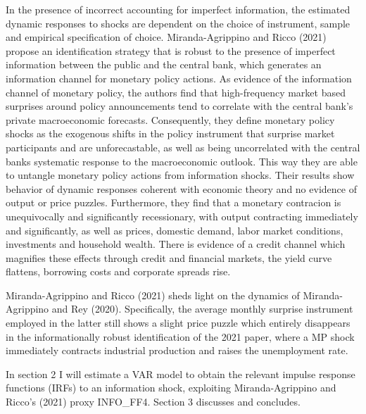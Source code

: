 \documentclass[11pt,a4paper,draft]{article}
\begin{document}
In the presence of incorrect accounting for imperfect information, the estimated dynamic responses to shocks are dependent on the choice of instrument, sample and empirical specification of choice. Miranda-Agrippino and Ricco (2021) propose an identification strategy that is robust to the presence of imperfect information between the public and the central bank, which generates an information channel for monetary policy actions. 
As evidence of the information channel of monetary policy, the authors find that high-frequency market based surprises around policy announcements tend to correlate with the central bank's private macroeconomic forecasts. Consequently, they define monetary policy shocks as the exogenous shifts in the policy instrument that surprise market participants and are unforecastable, as well as being uncorrelated with the central banks systematic response to the macroeconomic outlook.  This way they are able to untangle monetary policy actions from information shocks. 
Their results show behavior of dynamic responses coherent with economic theory and no evidence of output or price puzzles. Furthermore, they find that a monetary contracion is unequivocally and significantly recessionary, with output contracting immediately and significantly, as well as prices, domestic demand, labor market conditions, investments and household wealth. There is evidence of a credit channel which magnifies these effects through credit and financial markets, the yield curve flattens, borrowing costs and corporate spreads rise.





Miranda-Agrippino and Ricco (2021) sheds light on the dynamics of Miranda-Agrippino and Rey (2020). Specifically, the average monthly surprise instrument employed in the latter still shows a slight price puzzle which entirely disappears in the informationally robust identification of the 2021 paper, where a MP shock immediately contracts industrial production and raises the unemployment rate.



In section 2 I will estimate a VAR model to obtain the relevant impulse response functions (IRFs) to an information shock, exploiting Miranda-Agrippino and Ricco's (2021) proxy INFO\_FF4.
Section 3 discusses and concludes.
\end{document}
